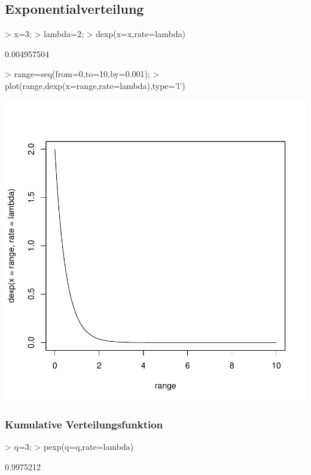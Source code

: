 \subsection{Exponentialverteilung}
\begin{Schunk}
\begin{Sinput}
> x=3;
> lambda=2;
> dexp(x=x,rate=lambda)
\end{Sinput}
\begin{Soutput}
[1] 0.004957504
\end{Soutput}
\begin{Sinput}
> range=seq(from=0,to=10,by=0.001);
> plot(range,dexp(x=range,rate=lambda),type='l')
\end{Sinput}
\end{Schunk}
\includegraphics{definitionen-021}

\subsubsection{Kumulative Verteilungsfunktion}
\begin{Schunk}
\begin{Sinput}
> q=3;
> pexp(q=q,rate=lambda)
\end{Sinput}
\begin{Soutput}
[1] 0.9975212
\end{Soutput}
\end{Schunk}

